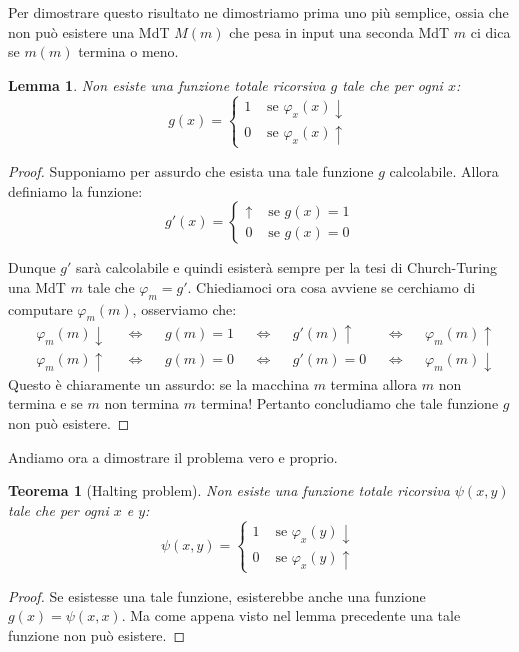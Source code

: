 \documentclass[a4paper,titlepage]{article}
\newtheorem{theorem}{Teorema}[section]
\newtheorem{lemma}{Lemma}[section]
\theoremstyle{definition}
\begin{document}
Per dimostrare questo risultato ne dimostriamo prima uno più semplice, ossia che non può esistere una MdT $M(m)$ che pesa in input una seconda MdT $m$ ci dica se $m(m)$ termina o meno. 
\begin{lemma}
	Non esiste una funzione totale ricorsiva $g$ tale che per ogni $x$:
	\[
		g(x) =
		\begin{cases}
			1  &\text{ se } \varphi_x(x)\downarrow\\
			0 &\text{ se } \varphi_x(x)\uparrow
		\end{cases}
	\]
\end{lemma}
\begin{proof}
	Supponiamo per assurdo che esista una tale funzione $g$ calcolabile. Allora definiamo la funzione:
	\[
		g'(x) =
		\begin{cases}
			\uparrow  &\text{ se } g(x) = 1 \\
			0 &\text{ se } g(x) = 0
		\end{cases}
	\]
	
	Dunque $g'$ sarà calcolabile e quindi esisterà sempre per la tesi di Church-Turing una MdT $m$ tale che $\varphi_{m} = g'$. Chiediamoci ora cosa avviene se cerchiamo di computare $\varphi_m(m)$, osserviamo che:
	\[
		\begin{aligned}
			&\varphi_m(m)\downarrow &&\iff &&g(m) = 1 &&\iff&& g'(m)\uparrow &&\iff&& \varphi_m(m)\uparrow\\
			&\varphi_m(m)\uparrow &&\iff &&g(m) = 0 &&\iff&& g'(m) = 0&&\iff&& \varphi_m(m)\downarrow 
		\end{aligned}
	\]
	Questo è chiaramente un assurdo: se la macchina $m$ termina allora $m$ non termina e se $m$ non termina $m$ termina! Pertanto concludiamo che tale funzione $g$ non può esistere. 
\end{proof}

Andiamo ora a dimostrare il problema vero e proprio. 
\begin{theorem}[Halting problem]
	Non esiste una funzione totale ricorsiva $\psi(x,y)$ tale che per ogni $x$ e $y$:
	\[
		\psi(x,y) =
		\begin{cases}
			1  &\text{ se } \varphi_x(y)\downarrow\\
			0 &\text{ se } \varphi_x(y)\uparrow
		\end{cases}
	\]
\end{theorem}
\begin{proof}
	Se esistesse una tale funzione, esisterebbe anche una funzione $g(x) = \psi(x,x)$. Ma come appena visto nel lemma precedente una tale funzione non può esistere. 
\end{proof}
\end{document}
